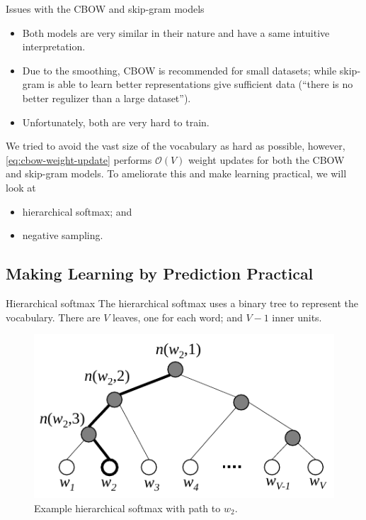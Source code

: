 \documentclass[serif, xcolor={svgnames, table}, usepdftitle=false]{beamer}
\begin{document}
\begin{frame}{Issues with the CBOW and skip-gram models}
  \begin{itemize}
  \item Both models are very similar in their nature and have a same intuitive
    interpretation.
  \item Due to the smoothing, CBOW is recommended for small datasets; while
    skip-gram is able to learn better representations give sufficient data
    (``there is no better regulizer than a large dataset'').
  \item Unfortunately, both are very hard to train.
  \end{itemize}

  We tried to avoid the vast size of the vocabulary as hard as possible,
  however, \eqref{eq:cbow-weight-update} performs \(\mathcal{O}(V)\) weight
  updates for both the CBOW and skip-gram models.  To ameliorate this and make
  learning practical, we will look at
  \begin{itemize}
  \item hierarchical softmax; and
  \item negative sampling.
  \end{itemize}
\end{frame}

\subsection{Making Learning by Prediction Practical}

\begin{frame}{Hierarchical softmax}
  The hierarchical softmax uses a binary tree to represent the vocabulary.
  There are \(V\) leaves, one for each word; and \(V - 1\) inner units.
  \begin{figure}
    \centering
    \includegraphics[width=.5\textwidth]{Hierarchical_Softmax.pdf}
    \caption{Example hierarchical softmax with path to \(w_2\).}
  \end{figure}  
\end{frame}
\end{document}

